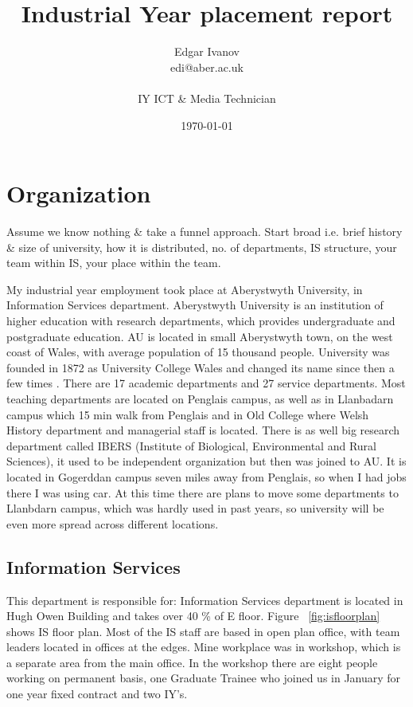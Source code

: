 \documentclass[10pt,a4paper,headinclude=true]{report}
\begin{document}
\onehalfspacing
\title{Industrial Year placement report}
\author{Edgar Ivanov\\ edi@aber.ac.uk \\ \\ IY ICT \& Media Technician}
\date{\today}
\maketitle

\tableofcontents

\chapter{\textbf{Organization}}
Assume we know nothing \& take a funnel approach. Start broad i.e. brief history \&
size of university, how it is distributed, no. of departments, IS structure, your
team within IS, your place within the team.

My industrial year employment took place at Aberystwyth University, in Information Services department. Aberystwyth University is an institution of higher education with research departments, which provides undergraduate and postgraduate education. AU is located in small Aberystwyth town, on the west coast of Wales, with average population of 15 thousand people. University was founded in 1872 as University College Wales and changed its name since then a few times \cite{History}. There are 17 academic departments and 27 service departments. Most teaching departments are located on Penglais campus, as well as in Llanbadarn campus which 15 min walk from Penglais and in Old College where Welsh History department and managerial staff is located. There is as well big research department called IBERS (Institute of Biological, Environmental and Rural Sciences), it used to be independent organization but then was joined to AU. It is located in Gogerddan campus seven miles away from Penglais, so when I had jobs there I was using car. At this time there are plans to move some departments to Llanbdarn campus, which was hardly used in past years, so university will be even more spread across different locations.

\section{Information Services}
This department is responsible for: 
Information Services department is located in Hugh Owen Building and takes over 40 \% of E floor. Figure ~\ref{fig:isfloorplan} shows IS floor plan. Most of the IS staff are based in open plan office, with team leaders located in offices at the edges. Mine workplace was in workshop, which is a separate area from the main office. In the workshop there are eight people working on permanent basis, one Graduate Trainee who joined us in January for one year fixed contract and two IY's.
\end{document}
